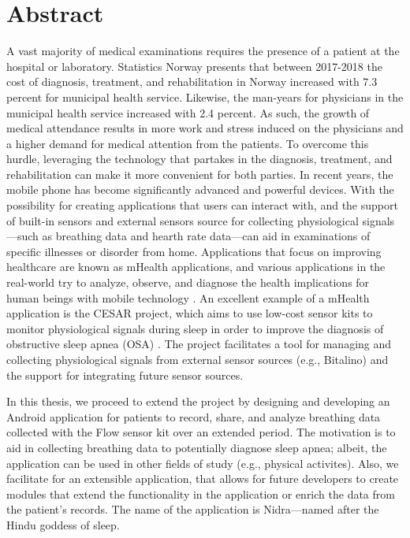 \documentclass[UKenglish]{ifimaster}  %
\begin{document}
\chapter*{Abstract}
 A vast majority of medical examinations requires the presence of a patient at the hospital or laboratory. Statistics Norway \cite{ssb} presents that between 2017-2018 the cost of diagnosis, treatment, and rehabilitation in Norway increased with 7.3 percent for municipal health service. Likewise, the man-years for physicians in the municipal health service increased with 2.4 percent. As such, the growth of medical attendance results in more work and stress induced on the physicians and a higher demand for medical attention from the patients. To overcome this hurdle, leveraging the technology that partakes in the diagnosis, treatment, and rehabilitation can make it more convenient for both parties. In recent years, the mobile phone has become significantly advanced and powerful devices. With the possibility for creating applications that users can interact with, and the support of built-in sensors and external sensors source for collecting physiological signals---such as breathing data and hearth rate data---can aid in examinations of specific illnesses or disorder from home. Applications that focus on improving healthcare are known as mHealth applications, and various applications in the real-world try to analyze, observe, and diagnose the health implications for human beings with mobile technology \cite{contactless_sleep, sam, mobilesleeplab}. An excellent example of a mHealth application is the CESAR project, which aims to use low-cost sensor kits to monitor physiological signals during sleep in order to improve the diagnosis of obstructive sleep apnea (OSA) \cite{cesar}. The project facilitates a tool for managing and collecting physiological signals from external sensor sources (e.g., Bitalino) and the support for integrating future sensor sources. 
 
 In this thesis, we proceed to extend the project by designing and developing an Android application for patients to record, share, and analyze breathing data collected with the Flow sensor kit over an extended period. The motivation is to aid in collecting breathing data to potentially diagnose sleep apnea; albeit, the application can be used in other fields of study (e.g., physical activites). Also, we facilitate for an extensible application, that allows for future developers to create modules that extend the functionality in the application or enrich the data from the patient's records. The name of the application is Nidra---named after the Hindu goddess of sleep.
\end{document}
